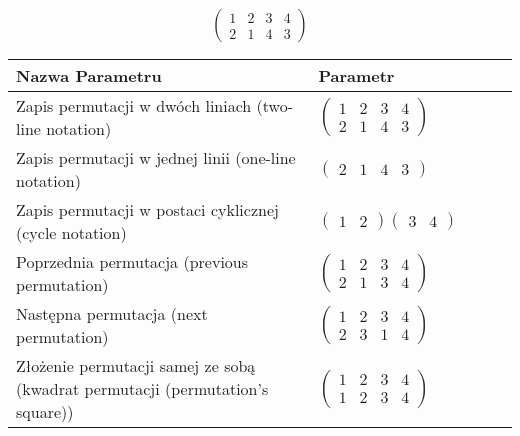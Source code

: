 \documentclass[12pt]{article}
\begin{document}
\subsection{}
\begin{center}
\[
\begin{pmatrix}
	1 & 2 & 3 & 4 \\ 
	2 & 1 & 4 & 3 
\end{pmatrix}
\]

\begin{tabular}{|m{0.6\linewidth}|m{0.4\linewidth}|}
	\hline
	Nazwa Parametru & Parametr \\
	\hline
	Zapis permutacji w dwóch liniach (two-line notation) & $\begin{pmatrix} 1 & 2 & 3 & 4 \\ 
2 & 1 & 4 & 3 \end{pmatrix}$ \\ 
	\hline
	Zapis permutacji w jednej linii (one-line notation) & $\begin{pmatrix} 2 & 1 & 4 & 3 \end{pmatrix}$ \\ 
	\hline
	Zapis permutacji w postaci cyklicznej (cycle notation) & $\begin{pmatrix} 1 & 2 \end{pmatrix} \begin{pmatrix} 3 & 4 \end{pmatrix} $ \\ 
	\hline
	Poprzednia permutacja (previous permutation) & $\begin{pmatrix} 1 & 2 & 3 & 4 \\ 
2 & 1 & 3 & 4 \end{pmatrix}$ \\ 
	\hline
	Następna permutacja (next permutation) & $\begin{pmatrix} 1 & 2 & 3 & 4 \\ 
2 & 3 & 1 & 4 \end{pmatrix}$ \\ 
	\hline
	Złożenie permutacji samej ze sobą (kwadrat permutacji (permutation's square)) & $\begin{pmatrix} 1 & 2 & 3 & 4 \\ 
1 & 2 & 3 & 4 \end{pmatrix}$ \\ 
	\hline
\end{tabular}
\end{center}
\end{document}
